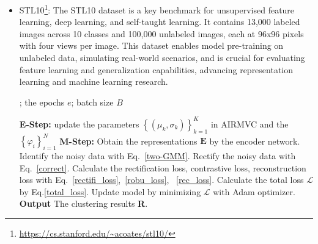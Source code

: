 \documentclass{article}
\theoremstyle{plain}
\theoremstyle{definition}
\theoremstyle{remark}
\begin{document}
\begin{itemize}
\item STL10\footnote{\url{https://cs.stanford.edu/~acoates/stl10/}}: The STL10 dataset is a key benchmark for unsupervised feature learning, deep learning, and self-taught learning. It contains 13,000 labeled images across 10 classes and 100,000 unlabeled images, each at 96x96 pixels with four views per image. This dataset enables model pre-training on unlabeled data, simulating real-world scenarios, and is crucial for evaluating feature learning and generalization capabilities, advancing representation learning and machine learning research.


\begin{algorithm}[]
\small
\caption{Training Algorithm of our designed AIRMVC}
\label{ALGORITHM}
; the epochs $e$; batch size $B$ \\
\begin{algorithmic}[1]
\STATE \textbf{E-Step:} update the parameters $\left \{ (\mu_k,\sigma _k) \right \}_{k=1}^K$ in AIRMVC and the $\left \{ \varphi_i \right \}_{i=1}^N$
\STATE \textbf{M-Step:} 
\REPEAT
\STATE Obtain the representations $\textbf{E}$ by the encoder network.
\STATE Identify the noisy data with Eq.~\eqref{two-GMM}.
\STATE Rectify the noisy data with Eq.~\eqref{correct}.
\STATE Calculate the rectification loss, contrastive loss, reconstruction loss with Eq.~\eqref{rectifi_loss},~\eqref{robu_loss}, ~\eqref{rec_loss}.
\STATE Calculate the total loss $\mathcal{L}$ by Eq.\eqref{total_loss}.
\STATE Update model by minimizing $\mathcal{L}$ with Adam optimizer.
\ENDFOR
\STATE \textbf{Output} The clustering results \textbf{R}.
\end{algorithmic}
\label{Algo}
\end{algorithm}


\end{itemize}
\end{document}
